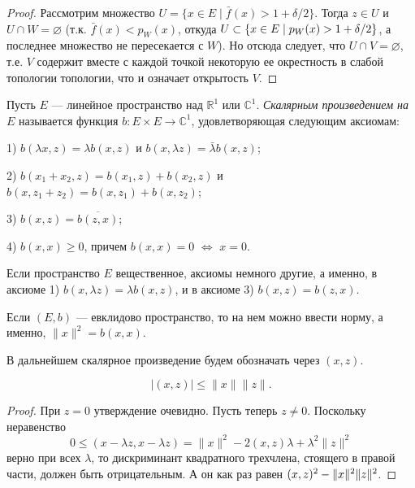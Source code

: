 \documentclass[10pt,titlepage, a4paper]{article}
\begin{document}
\begin{proof}
Рассмотрим множество $U=\{x\in E\mid \bar{f}(x)>1+\delta/2\}$. Тогда
$z\in U$ и $U\cap W=\varnothing$ (т.к. $\bar{f}(x)<p_W(x)$, откуда
$U\subset \{x\in E\mid p_W(x)>1\p+\delta/2\}$, а последнее множество
не пересекается с $W$). Но отсюда следует, что $U\cap
V=\varnothing$, т.е. $V$ содержит вместе с каждой точкой некоторую
ее окрестность в слабой топологии топологии, что и означает
открытость $V$.
\end{proof}
\lecture

\vspace{-25pt}


\begin{defen}
Пусть $E$ --- линейное пространство над $\mathbb{R}^1$ или
$\mathbb{C}^1$. \emph{Скалярным произведением на $E$} называется
функция $b\colon E\times E\to\mathbb{C}^1$, удовлетворяющая
следующим аксиомам:

1) $b(\lambda x,z)=\lambda b(x,z)$ и $b(x,\lambda z)=\bar{\lambda}
b(x,z)$;

2) $b(x_1+x_2,z)=b(x_1,z)+b(x_2,z)$ и
$b(x,z_1+z_2)=b(x,z_1)+b(x,z_2)$;

3) $b(x,z)=\overline{b(z,x)}$;

4) $b(x,x)\geqslant 0$, причем $b(x,x)=0$ $\Leftrightarrow$ $x=0$.

Если пространство $E$ вещественное, аксиомы немного другие, а
именно, в аксиоме 1) $b(x,\lambda z)=\lambda b(x,z)$, и в аксиоме 3)
$b(x,z)=b(z,x)$.
\end{defen}

Если $(E,b)$ --- евклидово пространство, то на нем можно ввести
норму, а именно, $\|x\|^2=b(x,x)$.

В дальнейшем скалярное произведение будем обозначать через $(x,z)$.

\begin{predl}
$$|(x,z)|\leqslant \|x\|\|z\|.$$
\end{predl}

\begin{proof}
При $z=0$ утверждение очевидно. Пусть теперь $z\neq 0$. Поскольку
неравенство
$$0\leqslant(x-\lambda z,x-\lambda z)=\|x\|^2-2(x,z)\lambda
+\lambda^2\|z\|^2$$ верно при всех $\lambda$, то дискриминант
квадратного трехчлена, стоящего в правой части, должен быть
отрицательным. А он как раз равен $(x,z)^2\p-\|x\|^2\|z\|^2$.
\end{proof}
\end{document}
